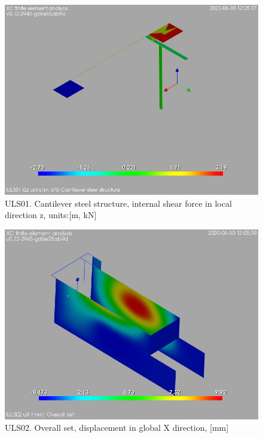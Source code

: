 \begin{figure}
\begin{center}
\includegraphics[width=\linewidth]{ramp_wall/resLC/text/graphics/resSimplLC/lULS01steelMembersQz}
\caption{ULS01. Cantilever steel structure, internal shear force in local direction z, units:[m, kN]}
\end{center}
\end{figure}
\clearpage
\begin{figure}
\begin{center}
\includegraphics[width=\linewidth]{ramp_wall/resLC/text/graphics/resSimplLC/lULS02overallSetuX}
\caption{ULS02. Overall set, displacement in global X direction, [mm]}
\end{center}
\end{figure}
